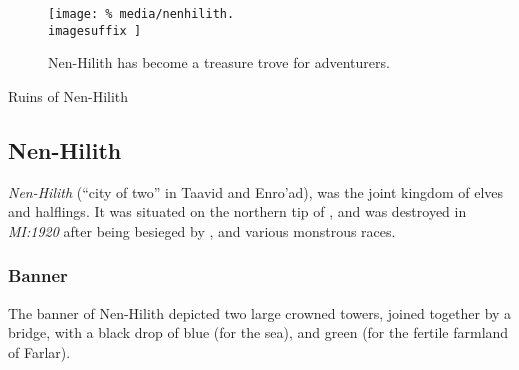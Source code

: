 \cleardoubleevenemptypage

\ifimages
\begin{figure*}[ht!]
  \centering
  \vspace{-4.6cm}
  \centerline{
    \texttt{[image: \%
      media/nenhilith.\\imagesuffix
    ]}
  }
  \par
  Nen-Hilith has become a treasure trove for adventurers.
\end{figure*}
\fi

\begin{infobox}{Ruins of Nen-Hilith}
  \begin{multicols}{2}
    \begin{itemize}[label={},noitemsep,leftmargin=0.0cm,topsep=0pt]
    \end{itemize}
  \end{multicols}
\end{infobox}

\clearpage

\subsection{Nen-Hilith}
\label{sec:Nen-Hilith}

\emph{Nen-Hilith} (``city of two'' in Taavid and Enro'ad), was the joint
kingdom of elves and halflings. It was situated on the northern tip of
, and was destroyed in \emph{MI:1920} after being besieged
by , and various monstrous races.

\subsubsection{Banner}

The banner of Nen-Hilith depicted two large crowned towers, joined together
by a bridge, with a black drop of blue (for the sea), and green (for the
fertile farmland of Farlar).

